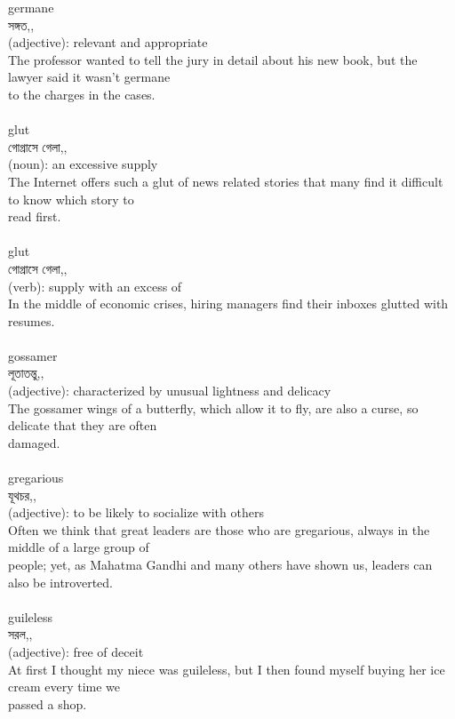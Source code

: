 \documentclass{article}
\begin{document}
{germane}\\
{সঙ্গত,,}\\
{(adjective): relevant and appropriate\\The professor wanted to tell the jury in detail about his new book, but the lawyer said it wasn't germane\\to the charges in the cases.\\}\\
{glut}\\
{গোগ্রাসে গেলা,,}\\
{(noun): an excessive supply\\The Internet offers such a glut of news related stories that many find it difficult to know which story to\\read first.\\}\\
{glut}\\
{গোগ্রাসে গেলা,,}\\
{(verb): supply with an excess of\\In the middle of economic crises, hiring managers find their inboxes glutted with resumes.\\}\\
{gossamer}\\
{লূতাতন্তু,,}\\
{(adjective): characterized by unusual lightness and delicacy\\The gossamer wings of a butterfly, which allow it to fly, are also a curse, so delicate that they are often\\damaged.\\}\\
{gregarious}\\
{যূথচর,,}\\
{(adjective): to be likely to socialize with others\\Often we think that great leaders are those who are gregarious, always in the middle of a large group of\\people; yet, as Mahatma Gandhi and many others have shown us, leaders can also be introverted.\\}\\
{guileless}\\
{সরল,,}\\
{(adjective): free of deceit\\At first I thought my niece was guileless, but I then found myself buying her ice cream every time we\\passed a shop.\\\\                                                                               \\}\\
\end{document}
